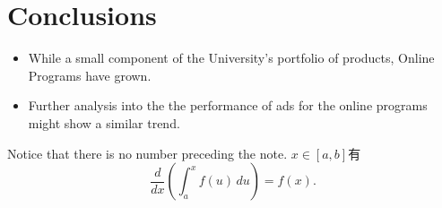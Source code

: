 \documentclass[]{tufte-handout}
\begin{document}
\hypertarget{conclusions}{%
\section{Conclusions}\label{conclusions}}

\begin{itemize}
\item
  While a small component of the University's portfolio of products,
  Online Programs have grown.
\item
  Further analysis into the the performance of ads for the online
  programs might show a similar trend.
\end{itemize}

\href{https://www.wrike.com/open.htm?id=589938175}{{}}

\href{https://github.com/edithbird/online-programs-application-flow}{{}}

\begin{marginfigure}
Notice that there is no number preceding the note. \(x \in [a, b]\)有
\[\frac{d}{dx}\left( \int_{a}^{x} f(u)\,du\right)=f(x).\]
\end{marginfigure}


\end{document}
